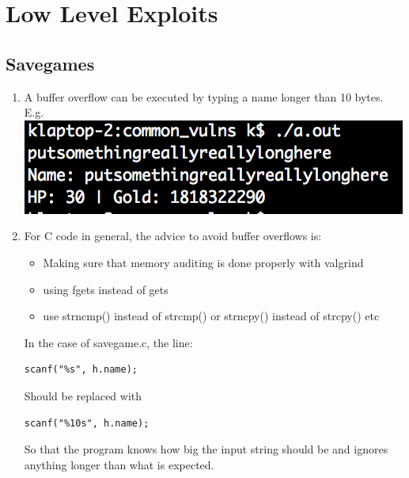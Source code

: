 \documentclass[9pt,a4paper]{article}
\begin{document}
\maketitle
\small
\setlength{\parindent}{0pt}

\section{Low Level Exploits}

\subsection{Savegames}
\begin{enumerate}
\item A buffer overflow can be executed by typing a name longer than 10 bytes.\\
E.g.\\
\includegraphics[scale=0.6]{overflow}

\item For C code in general, the advice to avoid buffer overflows is:
\begin{itemize}
\item Making sure that memory auditing is done properly with valgrind
\item using fgets instead of gets
\item use strncmp() instead of strcmp() or strncpy() instead of strcpy() etc
\end{itemize}

In the case of savegame.c, the line:
\lstset{language=c}
\begin{lstlisting}
scanf("%s", h.name);
\end{lstlisting}
Should be replaced with
\begin{lstlisting}
scanf("%10s", h.name);
\end{lstlisting}
So that the program knows how big the input string should be and ignores anything longer than what is expected.


\end{enumerate}
\end{document}
